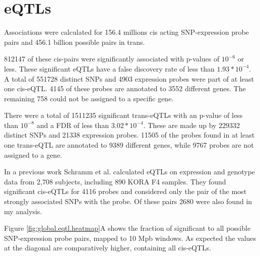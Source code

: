 \documentclass[a4paper,12pt,twoside,openright]{report}
\begin{document}

\section{eQTLs}
\label{Results:eQTLs}
Associations were calculated for 156.4 millions cis acting SNP-expression probe pairs and 456.1 billion possible pairs in trans. 

812147 of these cis-pairs were significantly associated with p-values of $10^{-6}$ or less. These significant eQTLs have a false discovery rate of less than $1.93*10^{-4}$. A total of 551728 distinct SNPs and 4903 expression probes were part of at least one cis-eQTL. 4145 of these probes are annotated to 3552 different genes. The remaining 
758 could not be assigned to a specific gene.

There were a total of 1511235 significant trans-eQTLs with an p-value of less than $10^{-8}$ and a FDR of less than $3.02*10^{-4}$. These are made up by 229332 distinct SNPs and 21338 expression probes. 11505 of the probes found in at least one trans-eQTL are annotated to 9389 different genes, while 9767 probes are not assigned to a gene.

In a previous work Schramm et al. \cite{10.1371/journal.pone.0093844} calculated eQTLs on expression and genotype data from 2,708 subjects, including 890 KORA F4 samples. They found significant cis-eQTLs for 4116 probes and considered only the pair of the most strongly associated SNPs with the probe. Of these pairs 2680 were also found in my analysis. 

Figure \ref{fig:global.eqtl.heatmap}A shows the fraction of significant to all possible  SNP-expression probe pairs, mapped to 10 Mpb windows. As expected the values at the diagonal are comparatively higher, containing all cis-eQTLs. 
\end{document}
